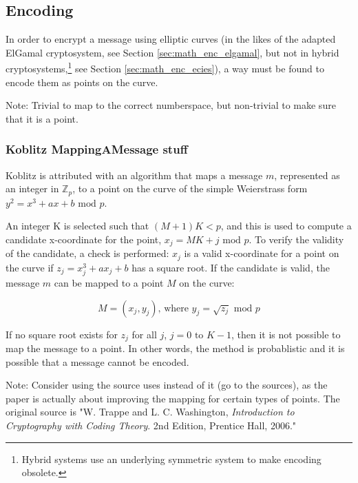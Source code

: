 \subsection{Encoding}
\label{sec:math_encoding}

In order to encrypt a message using elliptic curves (in the likes of the adapted ElGamal cryptosystem, see Section \ref{sec:math_enc_elgamal},
but not in hybrid cryptosystems,\footnote{Hybrid systems use an underlying symmetric system to make encoding obsolete.} see Section
\ref{sec:math_enc_ecies}), a way must be found to encode them as points on the curve.

Note: Trivial to map to the correct numberspace, but non-trivial to make sure that it is a point.

\subsubsection{Koblitz MappingAMessage stuff}

Koblitz is attributed with an algorithm that maps a message \(m\), represented as an integer in \(\mathbb{Z}_p\), to a point on the curve of the
simple Weierstrass form \(y^2 = x^3 + ax + b \text{ mod } p\).

An integer K is selected such that \((M + 1)K < p\), and this is used to compute
a candidate x-coordinate for the point, \(x_j = MK + j \text{ mod } p\). To verify the validity of the candidate, a check is performed: \(x_j\)
is a valid x-coordinate for a point on the curve if \(z_j = x_j^3 + ax_j + b\) has a square root. If the candidate is valid, the message \(m\)
can be mapped to a point \(M\) on the curve:

\begin{equation}
	M = (x_j, y_j) \text{, where } y_j = \sqrt{z_j} \text{ mod } p
\end{equation}

If no square root exists for \(z_j\) for all \(j\), \(j = 0 \text{ to } K-1\), then it is not possible to map the message to a point. In other
words, the method is probablistic and it is possible that a message cannot be encoded.\cite{MappingAMessage}

Note: Consider using the source \cite{MappingAMessage} uses instead of it (go to the sources), as the paper is actually about improving the mapping
for certain types of points. The original source is "W. Trappe and L. C. Washington, \emph{Introduction to Cryptography with Coding Theory}. 2nd Edition,
Prentice Hall, 2006."

